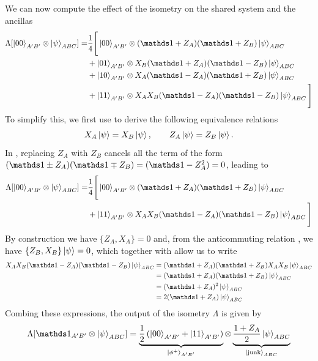 We can now compute the effect of the isometry on the shared system and the ancillas
\begin{equation}
	\begin{split}
		\Lambda[\ket{00}_{A'B'} \otimes \ket{\psi}_{ABC}] = &\frac{1}{4}\Bigg[\ket{00}_{A'B'}\otimes(\id+Z_A)(\id+Z_B)\ket{\psi}_{ABC} \\
													   & + \ket{01}_{A'B'} \otimes X_B(\id+Z_A)(\id-Z_B)\ket{\psi}_{ABC} \\
													   & + \ket{10}_{A'B'} \otimes X_A(\id-Z_A)(\id+Z_B)\ket{\psi}_{ABC} \\
													   & + \ket{11}_{A'B'} \otimes X_AX_B(\id-Z_A)(\id-Z_B)\ket{\psi}_{ABC} \Bigg]
	\end{split}	
	\label{eq:swap_output}
\end{equation}
To simplify this, we first use  to derive the following equivalence relations
\begin{equation}
	X_A \ket{\psi} = X_B \ket{\psi}, \qquad Z_A \ket{\psi} = Z_B \ket{\psi}.
	\label{eq:ABMeasEquivalence}
\end{equation}
In , replacing $Z_A$ with $Z_B$ cancels all the term of the form $(\id\pm Z_A)(\id\mp Z_B)=(\id-Z_A^2)=0$, leading to
\begin{equation}
	\begin{split}
		\Lambda[\ket{00}_{A'B'} \otimes \ket{\psi}_{ABC}] = &\frac{1}{4}\Bigg[\ket{00}_{A'B'}\otimes(\id+Z_A)(\id+Z_B)\ket{\psi}_{ABC} \\
													   & + \ket{11}_{A'B'} \otimes X_AX_B(\id-Z_A)(\id-Z_B)\ket{\psi}_{ABC} \Bigg]
	\end{split}	
\end{equation}
By construction we have $\{Z_A,X_A\}=0$ and, from the anticommuting relation , we have $\{Z_B,X_B\}\ket{\psi}=0$, which together with  allow us to write
\begin{equation}
	\begin{split}
		X_A X_B (\id - Z_A)(\id-Z_B)\ket{\psi}_{ABC} &= (\id + Z_A)(\id +Z_B)X_A X_B \ket{\psi}_{ABC}\\
									 &= (\id + Z_A)(\id + Z_B)\ket{\psi}_{ABC} \\
									 &= (\id + Z_A)^2\ket{\psi}_{ABC} \\
									 &= 2(\id + Z_A)\ket{\psi}_{ABC}
	\end{split}
\end{equation}
Combing these expressions, the output of the isometry $\Lambda$ is given by
\begin{equation}
	\Lambda[ \id_{A'B'} \otimes \ket{\psi}_{ABC} ] = \underbrace{\frac{1}{2}\left( \ket{00}_{A'B'} + \ket{11}_{A'B'} \right)}_{\ket{\phi^+}_{A'B'}} \otimes \underbrace{\frac{1+Z_A}{2}\ket{\psi}_{ABC}}_{\ket{\text{junk}}_{ABC}}
	\label{eq:isometry}
\end{equation}


